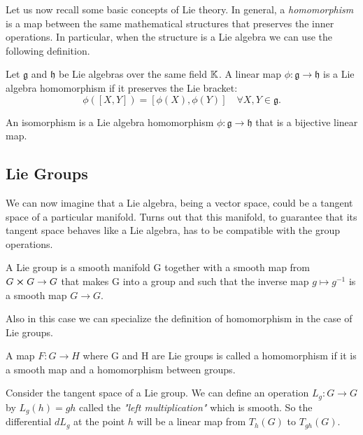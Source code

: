Let us now recall some basic concepts of Lie theory.
In general, a \textit{homomorphism} is a map between the same mathematical structures that preserves the inner operations. In particular, when the structure is a Lie algebra we can use the following definition.

\begin{definition}\label{def:lie-homo}
Let \(\mathfrak{g}\) and \(\mathfrak{h}\) be Lie algebras over the same field $\mathbb{K}$. A linear map \(\phi: \mathfrak{g} \rightarrow \mathfrak{h}\) is a Lie algebra homomorphism if it preserves the Lie bracket:
\[ 
	\phi([X, Y]) = [\phi(X), \phi(Y)] \quad \forall X, Y \in \mathfrak{g}.
\]
\end{definition}

\begin{definition}\label{def:lie-iso}
	An isomorphism is a Lie algebra homomorphism \(\phi: \mathfrak{g} \rightarrow \mathfrak{h}\) that is a bijective linear map.
\end{definition}

\subsection{Lie Groups}
We can now imagine that a Lie algebra, being a vector space, could be a tangent space of a particular manifold. Turns out that this manifold, to guarantee that its tangent space behaves like a Lie algebra, has to be compatible with the group operations. 

\begin{definition}\label{def:lie-group}
	A Lie group is a smooth manifold G together with a smooth map from $G \cross G \to G$ that makes G into a group and such that the inverse map $g \mapsto g^{-1}$ is a smooth map $G \to G$.
\end{definition}

Also in this case we can specialize the definition of homomorphism in the case of Lie groups.

\begin{definition}\label{def:lie-grhomo}
	A map $F: G \to H$ where G and H are Lie groups is called a homomorphism if it is a smooth map and a homomorphism between groups.
\end{definition}

Consider the tangent space of a Lie group. We can define an operation $L_g : G \to G$ by $L_g(h) = gh$ called the \textit{"left multiplication"} which is smooth. So the differential $dL_g$ at the point $h$ will be a linear map from $T_h(G)$ to $T_{gh}(G)$.

